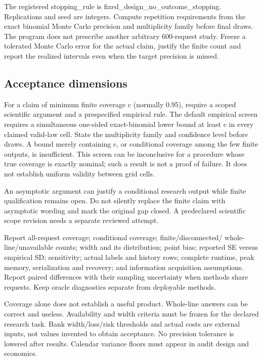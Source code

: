 \documentclass[
  11pt,
  a4paper,
]{article}
\begin{document}
The registered stopping\_rule is fixed\_design\_no\_outcome\_stopping.
Replications and seed are integers. Compute repetition requirements from
the exact binomial Monte Carlo precision and multiplicity family before
final draws. The program does not prescribe another arbitrary
600-request study. Freeze a tolerated Monte Carlo error for the actual
claim, justify the finite count and report the realized intervals even
when the target precision is missed.

\hypertarget{acceptance-dimensions}{%
\subsection{Acceptance dimensions}\label{acceptance-dimensions}}

For a claim of minimum finite coverage c (normally 0.95), require a
scoped scientific argument and a prespecified empirical rule. The
default empirical screen requires a simultaneous one-sided
exact-binomial lower bound at least c in every claimed valid-law cell.
State the multiplicity family and confidence level before draws. A bound
merely containing c, or conditional coverage among the few finite
outputs, is insufficient. This screen can be inconclusive for a
procedure whose true coverage is exactly nominal; such a result is not a
proof of failure. It does not establish uniform validity between grid
cells.

An asymptotic argument can justify a conditional research output while
finite qualification remains open. Do not silently replace the finite
claim with asymptotic wording and mark the original gap closed. A
predeclared scientific scope revision needs a separate reviewed attempt.

Report all-request coverage; conditional coverage; finite/disconnected/
whole-line/unavailable counts; width and its distribution; point bias;
reported SE versus empirical SD; sensitivity; actual labels and history
rows; complete runtime, peak memory, serialization and recovery; and
information acquisition assumptions. Report paired differences with
their sampling uncertainty when methods share requests. Keep oracle
diagnostics separate from deployable methods.

Coverage alone does not establish a useful product. Whole-line answers
can be correct and useless. Availability and width criteria must be
frozen for the declared research task. Bank width/loss/risk thresholds
and actual costs are external inputs, not values invented to obtain
acceptance. No precision tolerance is lowered after results. Calendar
variance floors must appear in audit design and economics.
\end{document}
